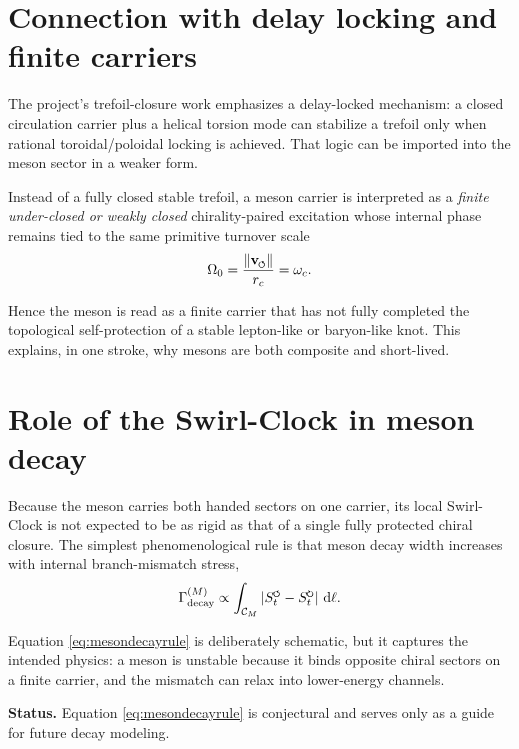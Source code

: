 \documentclass[11pt,a4paper]{article}
\newcommand{\swirlarrow}{\mathchoice{\mkern-2mu\scriptstyle\boldsymbol{\circlearrowleft}}{\mkern-2mu\scriptstyle\boldsymbol{\circlearrowleft}}{\mkern-2mu\scriptscriptstyle\boldsymbol{\circlearrowleft}}{\mkern-2mu\scriptscriptstyle\boldsymbol{\circlearrowleft}}}
\newcommand{\swirlarrowcw}{\mathchoice{\mkern-2mu\scriptstyle\boldsymbol{\circlearrowright}}{\mkern-2mu\scriptstyle\boldsymbol{\circlearrowright}}{\mkern-2mu\scriptscriptstyle\boldsymbol{\circlearrowright}}{\mkern-2mu\scriptscriptstyle\boldsymbol{\circlearrowright}}}
\newcommand{\vswirl}{\mathbf{v}_{\swirlarrow}}
\newcommand{\SwirlClock}{S_t^{\swirlarrow}}
\newcommand{\SwirlClockcw}{S_t^{\swirlarrowcw}}
\newcommand{\rc}{r_c}
\newcommand{\omegac}{\omega_c}
\newcommand{\Status}[1]{\par\smallskip\noindent\textbf{Status.} #1\par\smallskip}
\begin{document}
\section{Connection with delay locking and finite carriers}
The project's trefoil-closure work emphasizes a delay-locked mechanism: a closed circulation carrier plus a helical torsion mode can stabilize a trefoil only when rational toroidal/poloidal locking is achieved. That logic can be imported into the meson sector in a weaker form.

Instead of a fully closed stable trefoil, a meson carrier is interpreted as a \emph{finite under-closed or weakly closed} chirality-paired excitation whose internal phase remains tied to the same primitive turnover scale
\begin{equation}
\Omega_{0} = \frac{\lVert \vswirl \rVert}{\rc} = \omegac.
\end{equation}

Hence the meson is read as a finite carrier that has not fully completed the topological self-protection of a stable lepton-like or baryon-like knot. This explains, in one stroke, why mesons are both composite and short-lived.

\section{Role of the Swirl-Clock in meson decay}
Because the meson carries both handed sectors on one carrier, its local Swirl-Clock is not expected to be as rigid as that of a single fully protected chiral closure. The simplest phenomenological rule is that meson decay width increases with internal branch-mismatch stress,
\begin{equation}
\Gamma_{\text{decay}}^{(M)}
\propto
\int_{\mathcal{C}_{M}}
\left|\SwirlClock - \SwirlClockcw\right|\,\dd \ell.
\label{eq:mesondecayrule}
\end{equation}

Equation \eqref{eq:mesondecayrule} is deliberately schematic, but it captures the intended physics: a meson is unstable because it binds opposite chiral sectors on a finite carrier, and the mismatch can relax into lower-energy channels.

\Status{Equation \eqref{eq:mesondecayrule} is conjectural and serves only as a guide for future decay modeling.}
\end{document}
